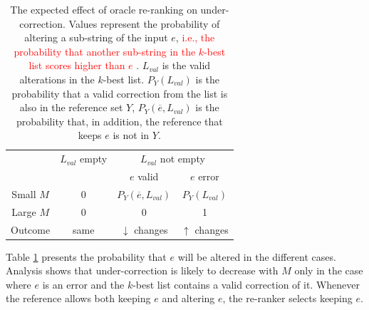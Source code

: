 \documentclass[11pt, a4paper]{article}
\begin{document}
\begin{table}[t]
	\centering
	\small
	\singlespacing
	\begin{tabular}{c|c|cc}
		& $L_{val}$ empty & \multicolumn{2}{c}{$L_{val}$ not empty} \\
		&            & $e$ valid & $e$ error \\ \hline
		\multicolumn{1}{c|}{Small $M$} & 0 & $P_Y(\overline{e}, L_{val})$ & $P_Y\left(L_{val}\right)$    \\
		\multicolumn{1}{c|}{Large $M$} & 0 & 0              & 1                  \\ \hline
		\multicolumn{1}{c|}{Outcome}            & same  & $\downarrow$ changes        & $\uparrow$ changes
	\end{tabular}
	\caption{\label{ta:oracle_expected_results}
		The expected effect of oracle re-ranking on under-correction.
		Values represent the probability of altering a sub-string of the input $e$, \textcolor{red}{i.e., the probability that another sub-string in the $k$-best list scores higher than $e$} . $L_{val}$ is the valid alterations in the $k$-best list. $P_Y\left(L_{val}\right)$ is the probability that a valid correction from the list is also in the reference set $Y$,
		$P_Y(\overline{e}, L_{val})$ is the probability that, in addition, the reference that keeps $e$ is not in $Y$.
	}
	
	
\end{table}

Table \ref{ta:oracle_expected_results} presents the probability that $e$ will be altered in the different cases.
Analysis shows that under-correction is likely to decrease with $M$ only
in the case where $e$ is an error and the $k$-best list contains a valid correction of it.
Whenever the reference allows both keeping $e$ and altering $e$, the re-ranker selects keeping $e$. 

\end{document}
